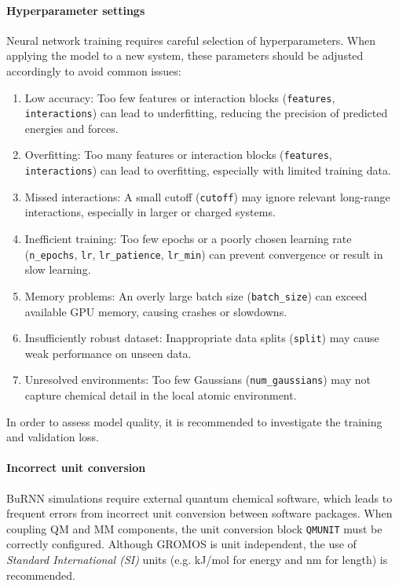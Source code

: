 \paragraph{Hyperparameter settings}
Neural network training requires careful selection of hyperparameters. When applying the model to a new system, these parameters should be adjusted accordingly to avoid common issues:
\begin{enumerate}
  \item[-] Low accuracy: Too few features or interaction blocks (\texttt{features}, \texttt{interactions}) can lead to underfitting, reducing the precision of predicted energies and forces.
  \item[-] Overfitting: Too many features or interaction blocks (\texttt{features}, \texttt{interactions}) can lead to overfitting, especially with limited training data.
  \item[-] Missed interactions: A small cutoff (\texttt{cutoff}) may ignore relevant long-range interactions, especially in larger or charged systems.
  \item[-] Inefficient training: Too few epochs or a poorly chosen learning rate (\texttt{n\_epochs}, \texttt{lr}, \texttt{lr\_patience}, \texttt{lr\_min}) can prevent convergence or result in slow learning.
  \item[-] Memory problems: An overly large batch size (\texttt{batch\_size}) can exceed available GPU memory, causing crashes or slowdowns.
  \item[-] Insufficiently robust dataset: Inappropriate data splits (\texttt{split}) may cause weak performance on unseen data.
  \item[-] Unresolved environments: Too few Gaussians (\texttt{num\_gaussians}) may not capture chemical detail in the local atomic environment.
\end{enumerate}

In order to assess model quality, it is recommended to investigate the training and validation loss.

\paragraph{Incorrect unit conversion}
BuRNN simulations require external quantum chemical software, which leads to frequent errors from incorrect unit conversion between software packages. 
When coupling QM and MM components, the unit conversion block \texttt{QMUNIT} must be correctly configured. Although GROMOS is unit independent, the use of \textit{Standard International (SI)} units (e.g. kJ/mol for energy and nm for length) is recommended.

